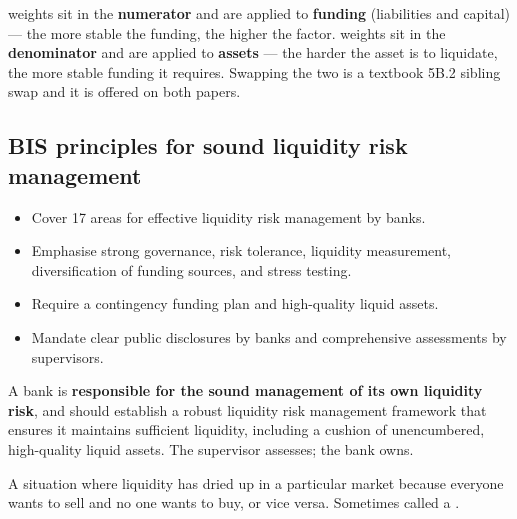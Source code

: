 \begin{lrtrapbox}
 weights sit in the \textbf{numerator} and are applied to \textbf{funding} (liabilities and capital) — the more stable the funding, the higher the factor.  weights sit in the \textbf{denominator} and are applied to \textbf{assets} — the harder the asset is to liquidate, the more stable funding it requires. Swapping the two is a textbook 5B.2 sibling swap and it is offered on both papers.
\end{lrtrapbox}

\subsection{BIS principles for sound liquidity risk management}

\begin{itemize}
\item Cover 17 areas for effective liquidity risk management by banks.
\item Emphasise strong governance, risk tolerance, liquidity measurement, diversification of funding sources, and stress testing.
\item Require a contingency funding plan and high-quality liquid assets.
\item Mandate clear public disclosures by banks and comprehensive assessments by supervisors.
\end{itemize}

\begin{lrkeybox}
A bank is \textbf{responsible for the sound management of its own liquidity risk}, and should establish a robust liquidity risk management framework that ensures it maintains sufficient liquidity, including a cushion of unencumbered, high-quality liquid assets. The supervisor assesses; the bank owns.
\end{lrkeybox}


\begin{lrdefbox}
A situation where liquidity has dried up in a particular market because everyone wants to sell and no one wants to buy, or vice versa. Sometimes called a .
\end{lrdefbox}

